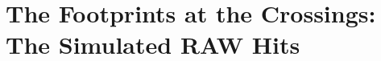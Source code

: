 \providecommand{\akfour}{\code{ak4GenJets}\xspace}
\providecommand{\MeV}{\ensuremath{\,\mathrm{MeV}}\xspace}
\providecommand{\keV}{\ensuremath{\,\mathrm{keV}}\xspace}
\providecommand{\cm}{\ensuremath{\,\mathrm{cm}}\xspace}
\providecommand{\um}{\ensuremath{\,\mu\mathrm{m}}\xspace}
\providecommand{\ns}{\ensuremath{\,\mathrm{ns}}\xspace}
\providecommand{\bx}{\ensuremath{\mathrm{bx}}\xspace}
\providecommand{\Xzero}{\ensuremath{X_0}\xspace}
\providecommand{\lamI}{\ensuremath{\lambda_I}\xspace}
\providecommand{\Mix}{\code{MixingModule}\xspace}

\chapter{The Footprints at the Crossings: The Simulated RAW Hits}
\label{ch:crowd_at_the_border}

